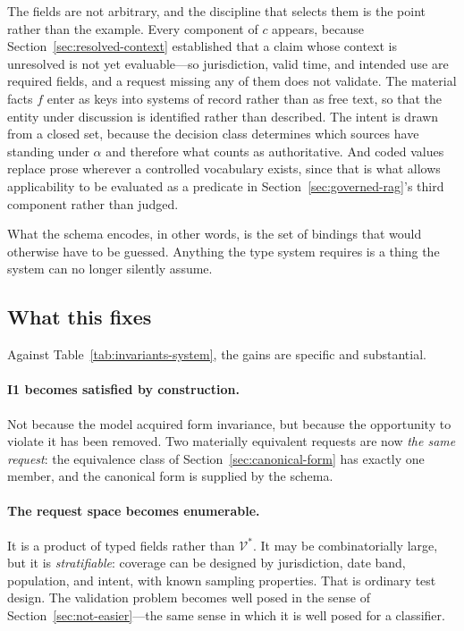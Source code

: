 \documentclass[11pt]{article}
\newcommand{\standing}{\alpha}
\theoremstyle{plain}
\theoremstyle{definition}
\begin{document}
The fields are not arbitrary, and the discipline that selects them is the point rather
than the example. Every component of $c$ appears, because
Section~\ref{sec:resolved-context} established that a claim whose context is unresolved is
not yet evaluable---so jurisdiction, valid time, and intended use are required fields, and
a request missing any of them does not validate. The material facts $f$ enter as keys into
systems of record rather than as free text, so that the entity under discussion is
identified rather than described. The intent is drawn from a closed set, because the
decision class determines which sources have standing under $\standing$ and therefore what
counts as authoritative. And coded values replace prose wherever a controlled vocabulary
exists, since that is what allows applicability to be evaluated as a predicate in
Section~\ref{sec:governed-rag}'s third component rather than judged.

What the schema encodes, in other words, is the set of bindings that would otherwise have
to be guessed. Anything the type system requires is a thing the system can no longer
silently assume.

\subsection{What this fixes}

Against Table~\ref{tab:invariants-system}, the gains are specific and substantial.

\paragraph{I1 becomes satisfied by construction.} Not because the model acquired form
invariance, but because the opportunity to violate it has been removed. Two
materially equivalent requests are now \emph{the same request}: the equivalence class
of Section~\ref{sec:canonical-form} has exactly one member, and the canonical form is
supplied by the schema.

\paragraph{The request space becomes enumerable.} It is a product of typed fields
rather than $\mathcal{V}^{*}$. It may be combinatorially large, but it is
\emph{stratifiable}: coverage can be designed by jurisdiction, date band, population,
and intent, with known sampling properties. That is ordinary test design. The
validation problem becomes well posed in the sense of
Section~\ref{sec:not-easier}---the same sense in which it is well posed for a
classifier.
\end{document}

